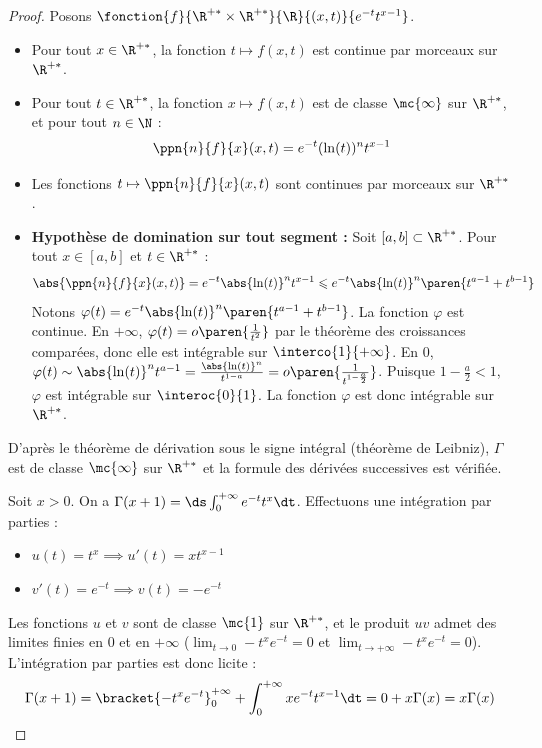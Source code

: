 \begin{proof}
    
    \svspace Posons $\fonction{f}{\R^{+*} \times \R^{+*}}{\R}{(x,t)}{e^{-t}t^{x-1}}$.
    \begin{itemize}
        \item Pour tout $x \in \R^{+*}$, la fonction $t \mapsto f(x,t)$ est continue par morceaux sur $\R^{+*}$.
        \item Pour tout $t \in \R^{+*}$, la fonction $x \mapsto f(x,t)$ est de classe $\mc{\infty}$ sur $\R^{+*}$, et pour tout $n \in \N$ :
        \[ \ppn{n}{f}{x}(x,t) = e^{-t}(\ln(t))^n t^{x-1} \]
        \item Les fonctions $t \mapsto \ppn{n}{f}{x}(x,t)$ sont continues par morceaux sur $\R^{+*}$.
        \item \textbf{Hypothèse de domination sur tout segment :} Soit $[a,b] \subset \R^{+*}$. Pour tout $x \in [a,b]$ et $t \in \R^{+*}$ :
        \[ \abs{\ppn{n}{f}{x}(x,t)} = e^{-t}\abs{\ln(t)}^n t^{x-1} \leqslant e^{-t}\abs{\ln(t)}^n \paren{t^{a-1} + t^{b-1}} \]
        Notons $\varphi(t) = e^{-t}\abs{\ln(t)}^n \paren{t^{a-1} + t^{b-1}}$. La fonction $\varphi$ est continue.
        En $+\infty$, $\varphi(t) = o\paren{\frac{1}{t^2}}$ par le théorème des croissances comparées, donc elle est intégrable sur $\interco{1}{+\infty}$.
        En $0$, $\varphi(t) \sim \abs{\ln(t)}^n t^{a-1} = \frac{\abs{\ln(t)}^n}{t^{1-a}} = o\paren{\frac{1}{t^{1-\frac{a}{2}}}}$.
        Puisque $1 - \frac{a}{2} < 1$, $\varphi$ est intégrable sur $\interoc{0}{1}$.
        La fonction $\varphi$ est donc intégrable sur $\R^{+*}$.
    \end{itemize}
    D'après le théorème de dérivation sous le signe intégral (théorème de Leibniz), $\Gamma$ est de classe $\mc{\infty}$ sur $\R^{+*}$ et la formule des dérivées successives est vérifiée.

    
    \svspace Soit $x > 0$. On a $\Gamma(x+1) = \ds\int_0^{+\infty} e^{-t} t^x \dt$.
    Effectuons une intégration par parties :
    \begin{itemize}
        \item $u(t) = t^x \implies u'(t) = x t^{x-1}$
        \item $v'(t) = e^{-t} \implies v(t) = -e^{-t}$
    \end{itemize}
    Les fonctions $u$ et $v$ sont de classe $\mc{1}$ sur $\R^{+*}$, et le produit $uv$ admet des limites finies en $0$ et en $+\infty$ ($\lim_{t\to 0} -t^x e^{-t} = 0$ et $\lim_{t\to+\infty} -t^x e^{-t} = 0$). L'intégration par parties est donc licite :
    \[ \Gamma(x+1) = \bracket{-t^x e^{-t}}_0^{+\infty} + \int_0^{+\infty} x e^{-t} t^{x-1} \dt = 0 + x \Gamma(x) = x \Gamma(x) \]


\end{proof}
